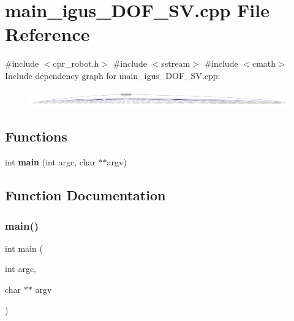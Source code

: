 \section{main\+\_\+igus\+\_\+D\+O\+F\+\_\+\+S\+V.\+cpp File Reference}
\label{main__igus__4DOF__SV_8cpp}
{\ttfamily \#include $<$cpr\+\_\+robot.\+h$>$}\newline
{\ttfamily \#include $<$sstream$>$}\newline
{\ttfamily \#include $<$cmath$>$}\newline
Include dependency graph for main\+\_\+igus\+\_\+D\+O\+F\+\_\+\+S\+V.\+cpp\+:
\nopagebreak
\begin{figure}[H]
\begin{center}
\leavevmode
\includegraphics[width=350pt]{main__igus__4DOF__SV_8cpp__incl}
\end{center}
\end{figure}
\subsection*{Functions}
\begin{DoxyCompactItemize}
\item 
int \textbf{ main} (int argc, char $\ast$$\ast$argv)
\end{DoxyCompactItemize}


\subsection{Function Documentation}
\mbox{\label{main__igus__4DOF__SV_8cpp_a3c04138a5bfe5d72780bb7e82a18e627}} 
\subsubsection{main()}
{\footnotesize\ttfamily int main (\begin{DoxyParamCaption}\item[{int}]{argc,  }\item[{char $\ast$$\ast$}]{argv }\end{DoxyParamCaption})}

